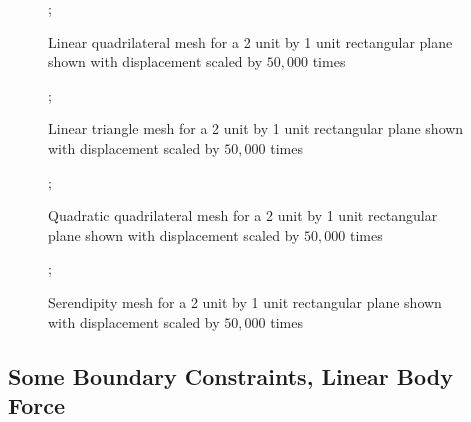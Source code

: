 \documentclass{article}
\begin{document}
\begin{figure}
    ;
    \caption{Linear quadrilateral mesh for a 2 unit by 1 unit rectangular plane shown with displacement scaled by $50,000$ times}
\centering
\end{figure}

\begin{figure}
    ;
    \caption{Linear triangle mesh for a 2 unit by 1 unit rectangular plane shown with displacement scaled by $50,000$ times}
\centering
\end{figure}

\begin{figure}
    ;
    \caption{Quadratic quadrilateral mesh for a 2 unit by 1 unit rectangular plane shown with displacement scaled by $50,000$ times}
\centering
\end{figure}



\begin{figure}
    ;
    \caption{Serendipity mesh for a 2 unit by 1 unit rectangular plane shown with displacement scaled by $50,000$ times}
\centering
\end{figure}


\FloatBarrier

\subsection{Some Boundary Constraints, Linear Body Force}
\FloatBarrier
\end{document}
